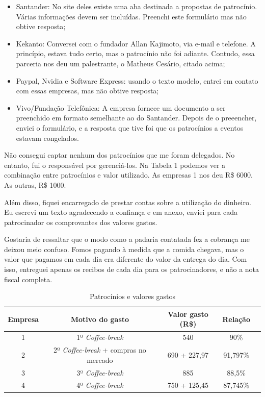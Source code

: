 \documentclass[12pt,letterpaper]{article}
\begin{document}
	\begin{itemize}
		\item Santander: No site deles existe uma aba destinada a propostas de patrocínio. Várias informações devem ser incluídas. Preenchi este formulário mas não obtive resposta;
		\item Kekanto: Conversei com o fundador Allan Kajimoto, via e-mail e telefone. A princípio, estava tudo certo, mas o patrocínio não foi adiante. Contudo, essa parceria nos deu um palestrante, o Matheus Cesário, citado acima;
		\item Paypal, Nvidia e Software Express: usando o texto modelo\cite{modelo_pat}, entrei em contato com essas empresas, mas não obtive resposta;
		\item Vivo/Fundação Telefônica: A empresa fornece um documento a ser preenchido em formato semelhante ao do Santander. Depois de o preeencher, enviei o formulário, e a resposta que tive foi que os patrocínios a eventos estavam congelados.
	\end{itemize}
	
	Não consegui captar nenhum dos patrocínios que me foram delegados. No entanto, fui o responsável por gerenciá-los. Na Tabela 1 podemos ver a combinação entre patrocínios e valor utilizado. As empresas 1 nos deu R\$ 6000. As outras, R\$ 1000.

	Além disso, fiquei encarregado de prestar contas sobre a utilização do dinheiro. Eu escrevi um texto agradecendo a confiança e em anexo, enviei para cada patrocinador os comprovantes dos valores gastos\cite{modelo_agr}.
		
	Gostaria de ressaltar que o modo como a padaria contatada fez a cobrança me deixou meio confuso. Fomos pagando à medida que a comida chegava, mas o valor que pagamos em cada dia era diferente do valor da entrega do dia. Com isso, entreguei apenas os recibos de cada dia para os patrocinadores, e não a nota fiscal completa.
	
	\begin{table}[]
		\centering
		\begin{tabular}{|c|c|c|c|c|}
			\hline Empresa & Motivo do gasto               & Valor gasto (R\$) & Relação  \\ \hline
			1       & 1º \textit{Coffee-break}                      & 540               & 90\%   \\  \hline
			2       & 2º \textit{Coffee-break} + compras no mercado & 690 + 227,97      & 91,797\% \\ \hline
			3       & 3º \textit{Coffee-break}                      & 885               & 88,5\% \\ \hline
			4       & 4º \textit{Coffee-break}                      & 750 + 125,45      & 87,745\% \\ \hline 
		\end{tabular}
		\caption{Patrocínios e valores gastos}
	\end{table}
	
\end{document}
